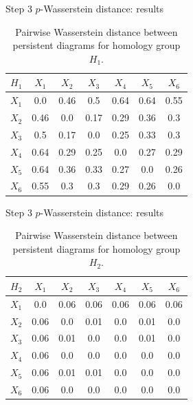 \documentclass[xcolor={dvipsnames,svgnames}]{beamer}
\begin{document}
\begin{frame}{Step 3 $p$-Wasserstein distance: results}
\begin{table}[!htbp]
        \centering
        \small
        \setlength\tabcolsep{5pt}
        \begin{tabular}{|c|c|c|c|c|c|c|}
\hline
 $H_1$& $X_1$ & $X_2$ & $X_3$ & $X_4$ & $X_5$ & $X_6$ \\ \hline
$X_1$ &
0.0&
0.46&
0.5&
0.64&
0.64&
0.55

\\\hline
$X_2$ &
0.46&
0.0&
0.17&
0.29&
0.36&
0.3
\\\hline
$X_3$ &
0.5&
0.17&
0.0&
0.25&
0.33&
0.3
\\\hline 
$X_4$ &
0.64&
0.29&
0.25&
0.0&
0.27&
0.29
\\\hline 
$X_5$ &
0.64&
0.36&
0.33&
0.27&
0.0&
0.26

\\\hline
$X_6$ &
0.55&
0.3&
0.3&
0.29&
0.26&
0.0\\
\hline
\end{tabular}
\caption{\scriptsize Pairwise Wasserstein distance between persistent diagrams for homology group $H_1$.}
\label{tab:Wass_H1}
\end{table}
\end{frame}

\begin{frame}{Step 3 $p$-Wasserstein distance: results}
\begin{table}[!htbp]
        \centering
        \small
        \setlength\tabcolsep{5pt}
        \begin{tabular}{|c|c|c|c|c|c|c|}
\hline
 $H_2$& $X_1$ & $X_2$ & $X_3$ & $X_4$ & $X_5$ & $X_6$ \\ \hline
$X_1$ &
0.0&
0.06&
0.06&
0.06&
0.06&
0.06
\\
\hline
$X_2$ &
0.06&
0.0&
0.01&
0.0&
0.01&
0.0
\\
\hline
$X_3$ &
0.06&
0.01&
0.0&
0.0&
0.01&
0.0
\\
\hline
$X_4$ &
0.06&
0.0&
0.0&
0.0&
0.0&
0.0
\\
\hline
$X_5$ &
0.06&
0.01&
0.01&
0.0&
0.0&
0.0
\\
\hline
$X_6$ &
0.06&
0.0&
0.0&
0.0&
0.0&
0.0
\\
\hline
\end{tabular}
\caption{\scriptsize Pairwise Wasserstein distance between persistent diagrams for homology group $H_2$.}
\label{tab:Wass_H2}
\end{table}
\end{frame}
\end{document}
